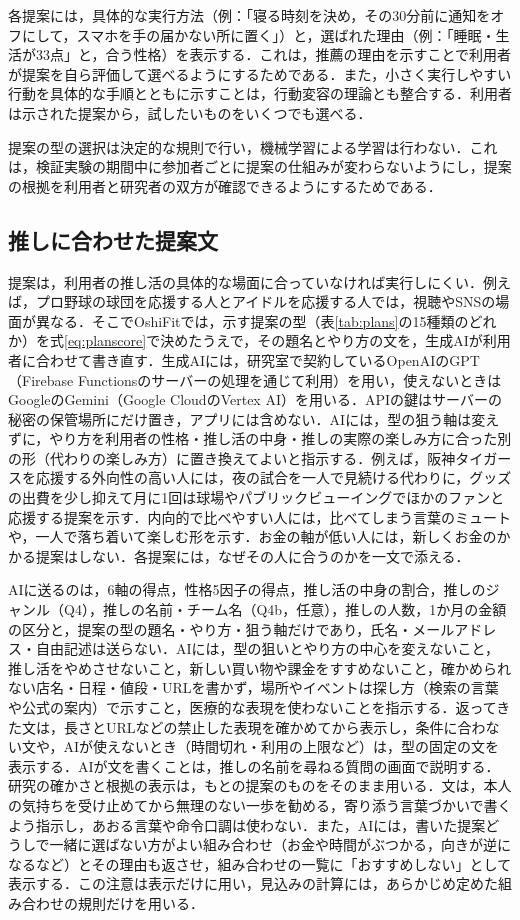 各提案には，具体的な実行方法（例：「寝る時刻を決め，その30分前に通知をオフにして，スマホを手の届かない所に置く」）と，選ばれた理由（例：「睡眠・生活が33点」と，合う性格）を表示する．これは，推薦の理由を示すことで利用者が提案を自ら評価して選べるようにするためである\cite{tintarev2007}．また，小さく実行しやすい行動を具体的な手順とともに示すことは，行動変容の理論\cite{fogg2009}とも整合する．利用者は示された提案から，試したいものをいくつでも選べる．

提案の型の選択は決定的な規則で行い，機械学習による学習は行わない．これは，検証実験の期間中に参加者ごとに提案の仕組みが変わらないようにし，提案の根拠を利用者と研究者の双方が確認できるようにするためである．

\subsection{推しに合わせた提案文}\label{sec:aitext}
提案は，利用者の推し活の具体的な場面に合っていなければ実行しにくい．例えば，プロ野球の球団を応援する人とアイドルを応援する人では，視聴やSNSの場面が異なる．そこでOshiFitでは，示す提案の型（表\ref{tab:plans}の15種類のどれか）を式\eqref{eq:planscore}で決めたうえで，その題名とやり方の文を，生成AIが利用者に合わせて書き直す．生成AIには，研究室で契約しているOpenAIのGPT（Firebase Functionsのサーバーの処理を通じて利用）を用い，使えないときはGoogleのGemini（Google CloudのVertex AI）を用いる．APIの鍵はサーバーの秘密の保管場所にだけ置き，アプリには含めない．AIには，型の狙う軸は変えずに，やり方を利用者の性格・推し活の中身・推しの実際の楽しみ方に合った別の形（代わりの楽しみ方）に置き換えてよいと指示する．例えば，阪神タイガースを応援する外向性の高い人には，夜の試合を一人で見続ける代わりに，グッズの出費を少し抑えて月に1回は球場やパブリックビューイングでほかのファンと応援する提案を示す．内向的で比べやすい人には，比べてしまう言葉のミュートや，一人で落ち着いて楽しむ形を示す．お金の軸が低い人には，新しくお金のかかる提案はしない．各提案には，なぜその人に合うのかを一文で添える．

AIに送るのは，6軸の得点，性格5因子の得点，推し活の中身の割合，推しのジャンル（Q4），推しの名前・チーム名（Q4b，任意），推しの人数，1か月の金額の区分と，提案の型の題名・やり方・狙う軸だけであり，氏名・メールアドレス・自由記述は送らない．AIには，型の狙いとやり方の中心を変えないこと，推し活をやめさせないこと，新しい買い物や課金をすすめないこと，確かめられない店名・日程・値段・URLを書かず，場所やイベントは探し方（検索の言葉や公式の案内）で示すこと，医療的な表現を使わないことを指示する．返ってきた文は，長さとURLなどの禁止した表現を確かめてから表示し，条件に合わない文や，AIが使えないとき（時間切れ・利用の上限など）は，型の固定の文を表示する．AIが文を書くことは，推しの名前を尋ねる質問の画面で説明する．研究の確かさと根拠の表示は，もとの提案のものをそのまま用いる．文は，本人の気持ちを受け止めてから無理のない一歩を勧める，寄り添う言葉づかいで書くよう指示し，あおる言葉や命令口調は使わない．また，AIには，書いた提案どうしで一緒に選ばない方がよい組み合わせ（お金や時間がぶつかる，向きが逆になるなど）とその理由も返させ，組み合わせの一覧に「おすすめしない」として表示する．この注意は表示だけに用い，見込みの計算には，あらかじめ定めた組み合わせの規則だけを用いる．

